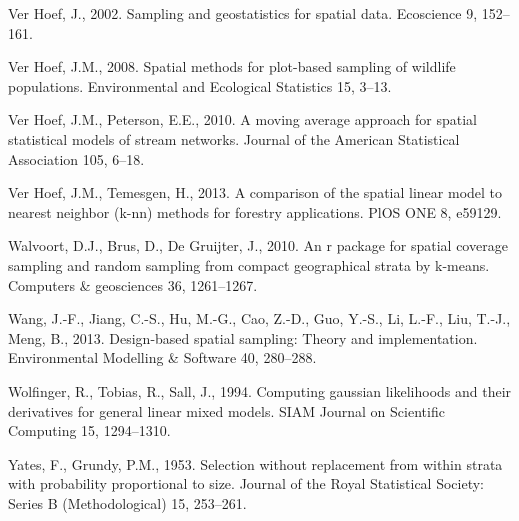 \documentclass[]{elsarticle} %
\begin{document}
\leavevmode\hypertarget{ref-verhoef2002sampling}{}%
Ver Hoef, J., 2002. Sampling and geostatistics for spatial data.
Ecoscience 9, 152--161.

\leavevmode\hypertarget{ref-verhoef2008spatial}{}%
Ver Hoef, J.M., 2008. Spatial methods for plot-based sampling of
wildlife populations. Environmental and Ecological Statistics 15, 3--13.

\leavevmode\hypertarget{ref-ver2010moving}{}%
Ver Hoef, J.M., Peterson, E.E., 2010. A moving average approach for
spatial statistical models of stream networks. Journal of the American
Statistical Association 105, 6--18.

\leavevmode\hypertarget{ref-ver2013comparison}{}%
Ver Hoef, J.M., Temesgen, H., 2013. A comparison of the spatial linear
model to nearest neighbor (k-nn) methods for forestry applications. PlOS
ONE 8, e59129.

\leavevmode\hypertarget{ref-walvoort2010r}{}%
Walvoort, D.J., Brus, D., De Gruijter, J., 2010. An r package for
spatial coverage sampling and random sampling from compact geographical
strata by k-means. Computers \& geosciences 36, 1261--1267.

\leavevmode\hypertarget{ref-wang2013design}{}%
Wang, J.-F., Jiang, C.-S., Hu, M.-G., Cao, Z.-D., Guo, Y.-S., Li, L.-F.,
Liu, T.-J., Meng, B., 2013. Design-based spatial sampling: Theory and
implementation. Environmental Modelling \& Software 40, 280--288.

\leavevmode\hypertarget{ref-wolfinger1994computing}{}%
Wolfinger, R., Tobias, R., Sall, J., 1994. Computing gaussian
likelihoods and their derivatives for general linear mixed models. SIAM
Journal on Scientific Computing 15, 1294--1310.

\leavevmode\hypertarget{ref-yates1953selection}{}%
Yates, F., Grundy, P.M., 1953. Selection without replacement from within
strata with probability proportional to size. Journal of the Royal
Statistical Society: Series B (Methodological) 15, 253--261.
\end{document}
